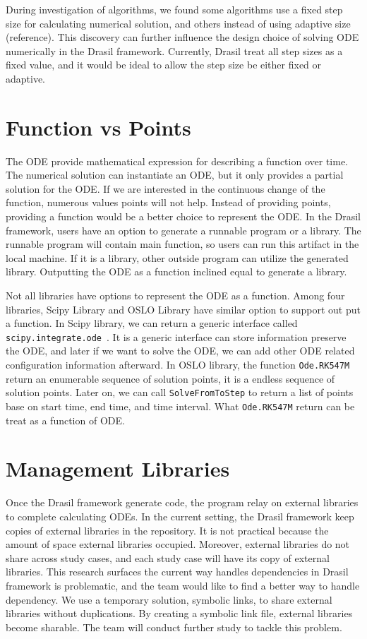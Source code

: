 During investigation of algorithms, we found some algorithms use a fixed step size for calculating numerical solution, and others instead of using adaptive size (reference). This discovery can further influence the design choice of solving ODE numerically in the Drasil framework. Currently, Drasil treat all step sizes as a fixed value, and it would be ideal to allow the step size be either fixed or adaptive.

\section{Function vs Points}
The ODE provide mathematical expression for describing a function over time. The numerical solution can instantiate an ODE, but it only provides a partial solution for the ODE. If we are interested in the continuous change of the function, numerous values points will not help. Instead of providing points, providing a function would be a better choice to represent the ODE. In the Drasil framework, users have an option to generate a runnable program or a library. The runnable program will contain main function, so users can run this artifact in the local machine. If it is a library, other outside program can utilize the generated library. Outputting the ODE as a function inclined equal to generate a library.

Not all libraries have options to represent the ODE as a function. Among four libraries, Scipy Library and OSLO Library have similar option to support out put a function. In Scipy library, we can return a generic interface called \verb|scipy.integrate.ode|~\citep{scipyfun}. It is a generic interface can store information preserve the ODE, and later if we want to solve the ODE, we can add other ODE related configuration information afterward. In OSLO library, the function \verb|Ode.RK547M| return an enumerable sequence of solution points, it is a endless sequence of solution points. Later on, we can call \verb|SolveFromToStep| to return a list of points base on start time, end time, and time interval. What \verb|Ode.RK547M| return can be treat as a function of ODE.

\section{Management Libraries}
Once the Drasil framework generate code, the program relay on external libraries to complete calculating ODEs. In the current setting, the Drasil framework keep copies of external libraries in the repository. It is not practical because the amount of space external libraries occupied. Moreover, external libraries do not share across study cases, and each study case will have its copy of external libraries. This research surfaces the current way handles dependencies in Drasil framework is problematic, and the team would like to find a better way to handle dependency. We use a temporary solution, symbolic links, to share external libraries without duplications. By creating a symbolic link file, external libraries become sharable. The team will conduct further study to tackle this problem.
